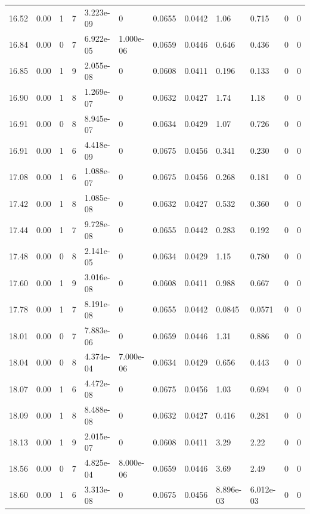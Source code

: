 \documentclass[preview]{standalone}
\begin{document}
{{{{{\begin{tabular}{L{1.2cm}C{1.2cm} C{0.3cm}C{0.5cm} C{1.4cm}C{1.4cm} C{1.4cm}C{1.4cm} C{1.6cm}C{1.6cm} C{1.6cm}C{1.6cm}}
  16.52  &  0.00  & 1     &  7 &  3.223e-09  & 0  &  0.0655&   0.0442& 1.06 & 0.715   &  0 & 0  \\ 
  16.84  &  0.00  & 0     &  7 &  6.922e-05  & 1.000e-06  &  0.0659&   0.0446& 0.646 & 0.436   &  0 & 0  \\ 
  16.85  &  0.00  & 1     &  9 &  2.055e-08  & 0  &  0.0608&   0.0411& 0.196 & 0.133   &  0 & 0  \\ 
  16.90  &  0.00  & 1     &  8 &  1.269e-07  & 0  &  0.0632&   0.0427& 1.74 & 1.18   &  0 & 0  \\ 
  16.91  &  0.00  & 0     &  8 &  8.945e-07  & 0  &  0.0634&   0.0429& 1.07 & 0.726   &  0 & 0  \\ 
  16.91  &  0.00  & 1     &  6 &  4.418e-09  & 0  &  0.0675&   0.0456& 0.341 & 0.230   &  0 & 0  \\ 
  17.08  &  0.00  & 1     &  6 &  1.088e-07  & 0  &  0.0675&   0.0456& 0.268 & 0.181   &  0 & 0  \\ 
  17.42  &  0.00  & 1     &  8 &  1.085e-08  & 0  &  0.0632&   0.0427& 0.532 & 0.360   &  0 & 0  \\ 
  17.44  &  0.00  & 1     &  7 &  9.728e-08  & 0  &  0.0655&   0.0442& 0.283 & 0.192   &  0 & 0  \\ 
  17.48  &  0.00  & 0     &  8 &  2.141e-05  & 0  &  0.0634&   0.0429& 1.15 & 0.780   &  0 & 0  \\ 
  17.60  &  0.00  & 1     &  9 &  3.016e-08  & 0  &  0.0608&   0.0411& 0.988 & 0.667   &  0 & 0  \\ 
  17.78  &  0.00  & 1     &  7 &  8.191e-08  & 0  &  0.0655&   0.0442& 0.0845 & 0.0571   &  0 & 0  \\ 
  18.01  &  0.00  & 0     &  7 &  7.883e-06  & 0  &  0.0659&   0.0446& 1.31 & 0.886   &  0 & 0  \\ 
  18.04  &  0.00  & 0     &  8 &  4.374e-04  & 7.000e-06  &  0.0634&   0.0429& 0.656 & 0.443   &  0 & 0  \\ 
  18.07  &  0.00  & 1     &  6 &  4.472e-08  & 0  &  0.0675&   0.0456& 1.03 & 0.694   &  0 & 0  \\ 
  18.09  &  0.00  & 1     &  8 &  8.488e-08  & 0  &  0.0632&   0.0427& 0.416 & 0.281   &  0 & 0  \\ 
  18.13  &  0.00  & 1     &  9 &  2.015e-07  & 0  &  0.0608&   0.0411& 3.29 & 2.22   &  0 & 0  \\ 
  18.56  &  0.00  & 0     &  7 &  4.825e-04  & 8.000e-06  &  0.0659&   0.0446& 3.69 & 2.49   &  0 & 0  \\ 
  18.60  &  0.00  & 1     &  6 &  3.313e-08  & 0  &  0.0675&   0.0456& 8.896e-03 & 6.012e-03   &  0 & 0  \\ 

\end{tabular}}}}}}
\end{document}
